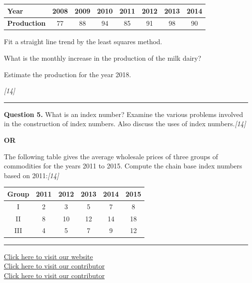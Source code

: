 \documentclass[11pt,a4paper]{article}
\newcommand{\pts}[1]{\hfill   \textit{[#1]}}
\begin{document}
\begin{center}
  \renewcommand{\arraystretch}{1.2}
  
\begin{tabular}{|l|c|c|c|c|c|c|c|}
    \hline
   \textbf{Year} & 2008 & 2009 & 2010 & 2011 & 2012 & 2013 & 2014 \\ \hline
   \textbf{Production} & 77 & 88 & 94 & 85 & 91 & 98 & 90 \\ \hline
  \end{tabular}
\end{center}

\begin{parts}
  \item Fit a straight line trend by the least squares method.
  \item What is the monthly increase in the production of the milk dairy?
  \item Estimate the production for the year 2018.
\end{parts}\pts{14}

\medskip\rule{\linewidth}{0.2pt}




\noindent   \textbf{Question 5.}
What is an index number? Examine the various problems involved in the construction of index numbers. Also discuss the uses of index numbers.\pts{14}

\centerline{   \textbf{OR}}

The following table gives the average wholesale prices of three groups of commodities for the years 2011 to 2015. Compute the chain base index numbers based on 2011:\pts{14}

\begin{center}
  \renewcommand{\arraystretch}{1.2}
  
\begin{tabular}{|c|c|c|c|c|c|}
    \hline
   \textbf{Group} &   \textbf{2011} &   \textbf{2012} &   \textbf{2013} &   \textbf{2014} &   \textbf{2015} \\ \hline
    I   & 2 & 3 & 5 & 7 & 8 \\ \hline
    II  & 8 & 10 & 12 & 14 & 18 \\ \hline
    III & 4 & 5 & 7 & 9 & 12 \\ \hline
  \end{tabular}
\end{center}

\vfill
\rule{\linewidth}{0.4pt}

\begin{center}\small
\href{https://bhu-exam.vercel.app/}{Click here to visit our website}\\[4pt]
\href{https://me-aryan.vercel.app/}{Click here to visit our contributor}\\[4pt]
\href{https://quashan-me.vercel.app/}{Click here to visit our contributor}
\end{center}
\end{document}
